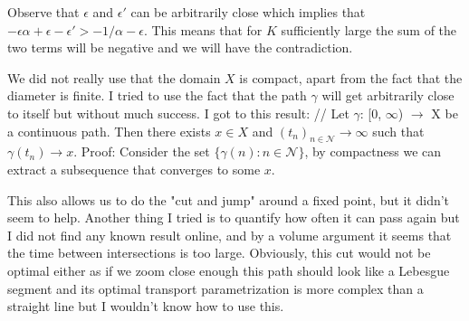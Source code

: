 \documentclass[11pt]{article}
\begin{document}
    Observe that $\epsilon$ and $\epsilon'$ can be arbitrarily close which implies that $-\epsilon\alpha + \epsilon - \epsilon' > -1/\alpha - \epsilon$.
    This means that for $K$ sufficiently large the sum of the two terms will be negative and we will have the contradiction.

    We did not really use that the domain $X$ is compact, apart from the fact that the diameter is finite. I tried to use the fact
    that the path $\gamma$ will get arbitrarily close to itself but without much success. I got to this result: //
    Let $\gamma$: [0, $\infty$) $\to$ X be a continuous path. Then there exists $x \in X$ and $(t_n)_{n \in  \mathcal{N}} \to \infty$ such that
    $\gamma(t_n) \to x$.
    Proof: Consider the set $\{\gamma(n): n \in \mathcal{N}\}$, by compactness we can extract a subsequence that converges to some $x$.

    This also allows us to do the "cut and jump" around a fixed point, but it didn't seem to help. Another thing I tried is to quantify how often
    it can pass again but I did not find any known result online, and by a volume argument it seems that the time between intersections is too large.
    Obviously, this cut would not be optimal either as if we zoom close enough this path should look like a Lebesgue segment
    and its optimal transport parametrization is more complex than a straight line but I wouldn't know how to use this.
\end{document}

